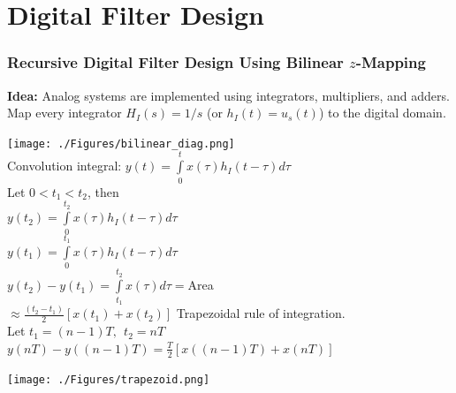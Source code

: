 \documentclass[mathserif, 10pt]{beamer} %
\begin{document}
\section{Digital Filter Design}
\frame
{
\vspace{-.8in}
\small
\frametitle{Recursive Digital Filter Design Using Bilinear $z$-Mapping}

\textbf{Idea:} Analog systems are implemented using integrators, multipliers, and adders. Map every integrator $H_I(s)  = 1/s$ (or $h_I(t) = u_s(t)$)
to the digital domain. \\ \vspace{.08in}

\texttt{[image: ./Figures/bilinear\_diag.png]} \\
Convolution integral: $y(t) = \int\limits_0^t x(\tau)h_I(t-\tau) d \tau$\\ \vspace{.05in}
Let $0<t_1<t_2$, then \\ \vspace{.05in}
$y(t_2) = \int\limits_0^{t_2} x(\tau)h_I(t-\tau) d \tau$\\ \vspace{.05in}
$y(t_1) = \int\limits_0^{t_1} x(\tau)h_I(t-\tau)d \tau$\\ \vspace{.05in}
$y(t_2)-y(t_1) = \int\limits_{t_1}^{t_2} x(\tau)d \tau = $Area\\ \vspace{.05in}
$\approx \frac{(t_2-t_1)}{2}[x(t_1)+x(t_2)]$ \hspace{.1in} Trapezoidal rule of integration.\\ \vspace{.05in}
Let $t_1 = (n-1)T,~~t_2 = nT$\\ \vspace{.05in}
$y(nT)-y((n-1)T) = \frac{T}{2}[x((n-1)T)+x(nT)]$\\ \vspace{.05in}

\vspace{-2.6in}
\hspace{2.5in}
\texttt{[image: ./Figures/trapezoid.png]}


}
\end{document}
